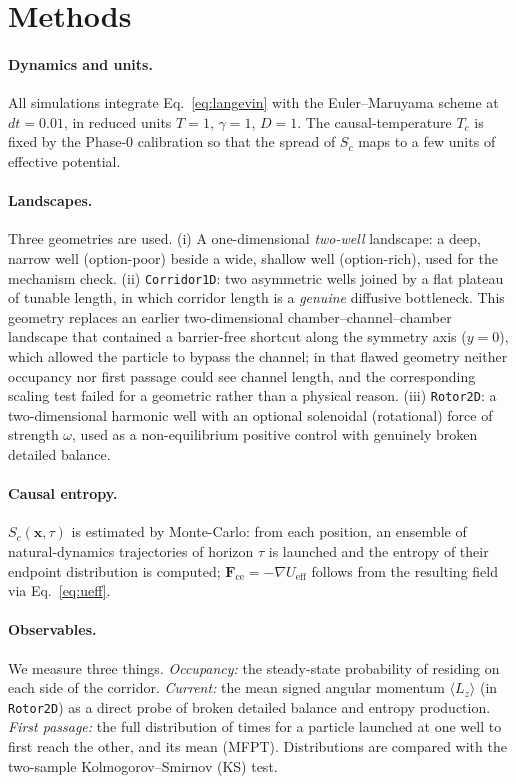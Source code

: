 \documentclass[11pt]{article}
\begin{document}
\section{Methods}

\paragraph{Dynamics and units.}
All simulations integrate Eq.~\eqref{eq:langevin} with the Euler--Maruyama scheme at $dt=0.01$, in reduced units $T=1$, $\gamma=1$, $D=1$. The causal-temperature $T_c$ is fixed by the Phase-0 calibration so that the spread of $S_c$ maps to a few units of effective potential.

\paragraph{Landscapes.}
Three geometries are used. (i) A one-dimensional \emph{two-well} landscape: a deep, narrow well (option-poor) beside a wide, shallow well (option-rich), used for the mechanism check. (ii) \texttt{Corridor1D}: two asymmetric wells joined by a flat plateau of tunable length, in which corridor length is a \emph{genuine} diffusive bottleneck. This geometry replaces an earlier two-dimensional chamber--channel--chamber landscape that contained a barrier-free shortcut along the symmetry axis ($y=0$), which allowed the particle to bypass the channel; in that flawed geometry neither occupancy nor first passage could see channel length, and the corresponding scaling test failed for a geometric rather than a physical reason. (iii) \texttt{Rotor2D}: a two-dimensional harmonic well with an optional solenoidal (rotational) force of strength $\omega$, used as a non-equilibrium positive control with genuinely broken detailed balance.

\paragraph{Causal entropy.}
$S_c(\mathbf{x},\tau)$ is estimated by Monte-Carlo: from each position, an ensemble of natural-dynamics trajectories of horizon $\tau$ is launched and the entropy of their endpoint distribution is computed; $\mathbf{F}_{\text{ce}}=-\nabla U_{\text{eff}}$ follows from the resulting field via Eq.~\eqref{eq:ueff}.

\paragraph{Observables.}
We measure three things. \emph{Occupancy:} the steady-state probability of residing on each side of the corridor. \emph{Current:} the mean signed angular momentum $\langle L_z\rangle$ (in \texttt{Rotor2D}) as a direct probe of broken detailed balance and entropy production. \emph{First passage:} the full distribution of times for a particle launched at one well to first reach the other, and its mean (MFPT). Distributions are compared with the two-sample Kolmogorov--Smirnov (KS) test.
\end{document}
